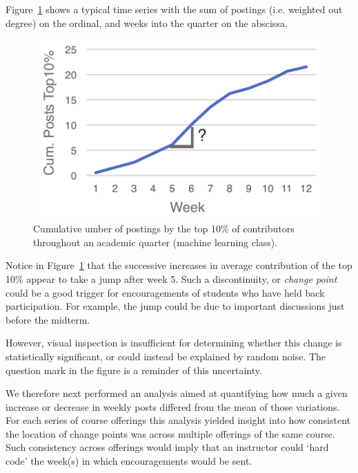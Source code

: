 Figure~\ref{fig:cs229OutDeg} shows a typical time series with the sum
of postings (i.e. weighted out degree) on the ordinal, and weeks into
the quarter on the abscissa.
\begin{figure}[]
       \centering
       \includegraphics{Figs/CS229Fall15DataContributionsNoFrills.pdf}
       \caption{\textnormal{Cumulative umber of postings by the top 10\% of
           contributors throughout an academic quarter (machine
           learning class).}}
       \label{fig:cs229OutDeg}
\end{figure}
Notice in Figure~\ref{fig:cs229OutDeg} that the successive increases
in average contribution of the top 10\% appear to take a jump after
week 5. Such a discontinuity, or {\em change point} could be a good
trigger for encouragements of students who have held back
participation. For example, the jump could be due to important
discussions just before the midterm.

However, visual inspection is insufficient for determining whether
this change is statistically significant, or could instead be
explained by random noise. The question mark in the figure is a
reminder of this uncertainty.

We therefore next performed an analysis aimed at quantifying how much
a given increase or decrease in weekly posts differed from the mean of
those variations. For each series of course offerings this analysis
yielded insight into how consistent the location of change points was
across multiple offerings of the same course. Such consistency across
offerings would imply that an instructor could `hard code' the week(s)
in which encouragements would be sent.

